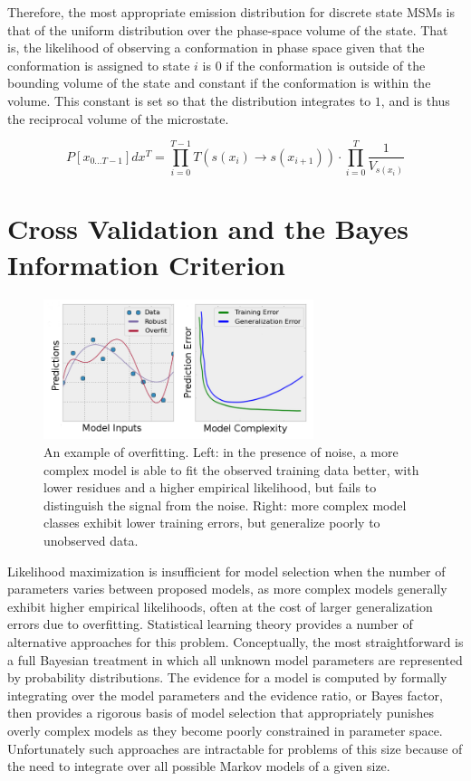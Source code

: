 \documentclass[twocolumn,floatfix,nofootinbib,aps]{revtex4-1}
\begin{document}
Therefore, the most appropriate emission distribution for discrete state MSMs is that of the uniform distribution over the phase-space volume of the state. That is, the likelihood of observing a conformation in phase space given that the conformation is assigned to state $i$ is $0$ if the conformation is outside of the bounding volume of the state and constant if the conformation is within the volume. This constant is set so that the distribution integrates to $1$, and is thus the reciprocal volume of the microstate.

\begin{equation}
\label{eq:like_vol}
P[x_{0...T-1}] dx^T = \prod_{i=0}^{T-1} T(s(x_i) \rightarrow s(x_{i+1})) \cdot \prod_{i=0}^T \frac{1}{V_{s(x_{i})}}
\end{equation}

\section{Cross Validation and the Bayes Information Criterion}

\begin{figure}
\centering
\includegraphics[width=3.1in]{figs/overfitting.png}
\caption{An example of overfitting. Left: in the presence of noise, a more complex model is able to fit the observed training data better, with lower residues and a higher empirical likelihood, but fails to distinguish the signal from the noise. Right: more complex model classes exhibit lower training errors, but generalize poorly to unobserved data.}
\end{figure}

Likelihood maximization is insufficient for model selection when the number of parameters varies between proposed models, as more complex models generally exhibit higher empirical likelihoods, often at the cost of larger generalization errors due to overfitting\cite{Hastie01Elements}. Statistical learning theory provides a number of alternative approaches for this problem. Conceptually, the most straightforward is a full Bayesian treatment in which all unknown model parameters are represented by probability distributions. The evidence for a model is computed by formally integrating over the model parameters and the evidence ratio, or Bayes factor\cite{Gelfand94Bayesian}, then provides a rigorous basis of model selection that appropriately punishes overly complex models as they become poorly constrained in parameter space. Unfortunately such approaches are intractable for problems of this size because of the need to integrate over all possible Markov models of a given size.
\end{document}
